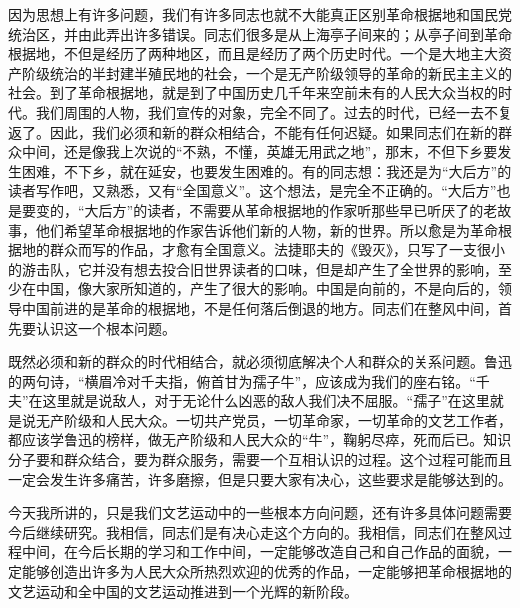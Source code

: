 因为思想上有许多问题，我们有许多同志也就不大能真正区别革命根据地和国民党统治区，并由此弄出许多错误。同志们很多是从上海亭子间来的；从亭子间到革命根据地，不但是经历了两种地区，而且是经历了两个历史时代。一个是大地主大资产阶级统治的半封建半殖民地的社会，一个是无产阶级领导的革命的新民主主义的社会。到了革命根据地，就是到了中国历史几千年来空前未有的人民大众当权的时代。我们周围的人物，我们宣传的对象，完全不同了。过去的时代，已经一去不复返了。因此，我们必须和新的群众相结合，不能有任何迟疑。如果同志们在新的群众中间，还是像我上次说的“不熟，不懂，英雄无用武之地”，那末，不但下乡要发生困难，不下乡，就在延安，也要发生困难的。有的同志想：我还是为“大后方”的读者写作吧，又熟悉，又有“全国意义”。这个想法，是完全不正确的。“大后方”也是要变的，“大后方”的读者，不需要从革命根据地的作家听那些早已听厌了的老故事，他们希望革命根据地的作家告诉他们新的人物，新的世界。所以愈是为革命根据地的群众而写的作品，才愈有全国意义。法捷耶夫的《毁灭》，只写了一支很小的游击队，它并没有想去投合旧世界读者的口味，但是却产生了全世界的影响，至少在中国，像大家所知道的，产生了很大的影响。中国是向前的，不是向后的，领导中国前进的是革命的根据地，不是任何落后倒退的地方。同志们在整风中间，首先要认识这一个根本问题。

既然必须和新的群众的时代相结合，就必须彻底解决个人和群众的关系问题。鲁迅的两句诗，“横眉冷对千夫指，俯首甘为孺子牛”，应该成为我们的座右铭。“千夫”在这里就是说敌人，对于无论什么凶恶的敌人我们决不屈服。“孺子”在这里就是说无产阶级和人民大众。一切共产党员，一切革命家，一切革命的文艺工作者，都应该学鲁迅的榜样，做无产阶级和人民大众的“牛”，鞠躬尽瘁，死而后已。知识分子要和群众结合，要为群众服务，需要一个互相认识的过程。这个过程可能而且一定会发生许多痛苦，许多磨擦，但是只要大家有决心，这些要求是能够达到的。

今天我所讲的，只是我们文艺运动中的一些根本方向问题，还有许多具体问题需要今后继续研究。我相信，同志们是有决心走这个方向的。我相信，同志们在整风过程中间，在今后长期的学习和工作中间，一定能够改造自己和自己作品的面貌，一定能够创造出许多为人民大众所热烈欢迎的优秀的作品，一定能够把革命根据地的文艺运动和全中国的文艺运动推进到一个光辉的新阶段。



